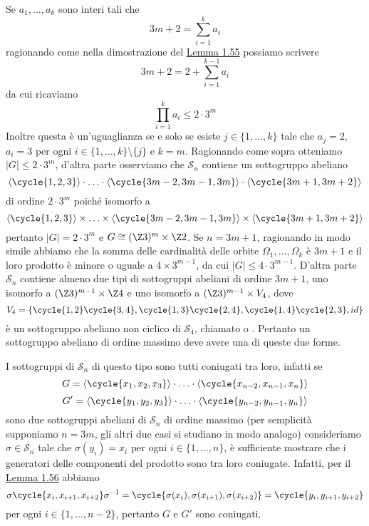 \documentclass[11pt]{scrartcl}
\begin{document}
\begin{remark}
    Se $a_1, \ldots, a_k$ sono interi tali che 
    \[
        3m + 2 = \sum_{i = 1}^k a_i
    \]
    ragionando come nella dimostrazione del \hyperref[lemma1.55]{Lemma 1.55}
    possiamo scrivere
    \[
        3m + 2 = 2 + \sum_{i = 1}^{k - 1}a_i
    \]
    da cui ricaviamo
    \[
        \prod_{i = 1}^k a_i \leqslant 2\cdot3^m
    \]
    Inoltre questa è un'uguaglianza se e solo se esiste $j \in \{1, \ldots, k\}$
    tale che $a_j = 2$, $a_i = 3$ per ogni $i \in \{1, \ldots, k\}\setminus\{j\}$
    e $k = m$. Ragionando come sopra otteniamo $|G| \leqslant 2\cdot 3^m$, 
    d'altra parte osserviamo che $\mathcal{S}_n$ contiene un sottogruppo abeliano
    \[
        \langle\cycle{1, 2, 3}\rangle\cdot\ldots\cdot\langle\cycle{3m - 2, 3m - 1, 3m}\rangle\cdot\langle\cycle{3m + 1, 3m + 2}\rangle
    \]
    di ordine $2\cdot3^m$ poiché isomorfo a 
    \[
        \langle\cycle{1, 2, 3}\rangle\times\ldots\times\langle\cycle{3m - 2, 3m - 1, 3m}\rangle\times\langle\cycle{3m + 1, 3m + 2}\rangle
    \]
    pertanto $|G| = 2\cdot3^m$ e $G \cong (\Z3)^m \times \Z2$.
    Se $n = 3m + 1$, ragionando in modo simile abbiamo che la somma delle
    cardinalità delle orbite $\Omega_1, \ldots, \Omega_k$ è $3m + 1$ e il 
    loro prodotto è minore o uguale a $4\times 3^{m - 1}$, da cui $|G| \leq
    4\cdot3^{m - 1}$. D'altra parte $\mathcal{S}_n$ contiene almeno due tipi di 
    sottogruppi abeliani di ordine $3m + 1$, uno isomorfo a 
    $(\Z3)^{m - 1} \times \Z4$ e uno isomorfo a $(\Z3)^{m - 1}\times V_4$,
    dove 
    \[
        V_4 = \{\cycle{1, 2}\cycle{3, 4}, \cycle{1, 3}\cycle{2, 4}, 
    \cycle{1, 4}\cycle{2, 3}, id\}
    \]
    è un sottogruppo abeliano non ciclico di $\mathcal{S}_4$, chiamato 
     o . Pertanto un sottogruppo
    abeliano di ordine massimo deve avere una di queste due forme.
\end{remark}

\begin{remark}
    I sottogruppi di $\mathcal{S}_n$ di questo tipo sono tutti coniugati tra loro, infatti
    se 
    \[
        G = \langle\cycle{x_1, x_2, x_3}\rangle\cdot\ldots\cdot\langle\cycle{x_{n - 2}, x_{n - 1}, x_n}\rangle
    \]
    \[
        G' = \langle\cycle{y_1, y_2, y_3}\rangle\cdot\ldots\cdot\langle\cycle{y_{n - 2}, y_{n - 1}, y_n}\rangle
    \]
    sono due sottogruppi abeliani di $\mathcal{S}_n$ di ordine massimo (per semplicità
    supponiamo $n = 3m$, gli altri due casi si studiano in modo analogo)
    consideriamo $\sigma \in \mathcal{S}_n$ tale che $\sigma(y_i) = x_i$ per ogni 
    $i \in \{1, \ldots, n\}$, è sufficiente mostrare che i generatori delle componenti del
    prodotto sono tra loro coniugate. Infatti, per il \hyperref[lemma1.56]{Lemma 1.56}
    abbiamo 
    \[
        \sigma\cycle{x_i, x_{i + 1}, x_{i + 2}}\sigma^{-1} = 
        \cycle{\sigma(x_i), \sigma(x_{i + 1}), \sigma(x_{i + 2})} = 
        \cycle{y_i, y_{i + 1}, y_{i + 2}}
    \]
    per ogni $i \in \{1, \ldots, n - 2\}$, pertanto $G$ e $G'$ sono coniugati.
\end{remark}
\end{document}
